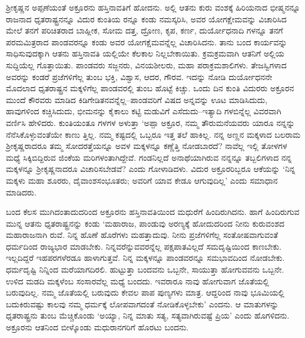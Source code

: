 ಶ್ರೀಕೃಷ್ಣನ ಅಪ್ಪಣೆಯಂತೆ ಅಕ್ರೂರನು ಹಸ್ತಿನಾವತಿಗೆ ಹೋದನು. ಅಲ್ಲಿ ಆತನು ಕುರು ವಂಶಕ್ಕೆ ಹಿರಿಯನಾದ ಭೀಷ್ಮನನ್ನೂ ರಾಜನಾದ ಧೃತರಾಷ್ಟ್ರನನ್ನೂ ವಿದುರ ಕುಂತಿಯ ರನ್ನೂ ಕಂಡು ನಮಸ್ಕರಿಸಿ, ಅವರ ಯೋಗಕ್ಷೇಮವನ್ನು ವಿಚಾರಿಸಿದ ಮೇಲೆ ತನಗೆ ಪರಿಚಿತರಾದ ಬಾಹ್ಲೀಕ, ಸೋಮ ದತ್ತ, ದ್ರೋಣ, ಕೃಪ, ಕರ್ಣ, ದುರ್ಯೋಧನಾದಿ ಗಳನ್ನೂ ತನಗೆ ಪರಮಮಿತ್ರರಾದ ಪಾಂಡವರನ್ನೂ ಕಂಡು ಅವರ ಯೋಗಕ್ಷೆಮವನ್ನೆಲ್ಲ ವಿಚಾರಿಸಿದನು. ತಾನು ಬಂದ ಕಾರ್ಯವನ್ನು ಸಾಧಿಸುವುದಕ್ಕಾಗಿ ಆತನು ಹಸ್ತಿನಾವತಿ ಯಲ್ಲಿಯೇ ಕೆಲಕಾಲ ನಿಲ್ಲಬೇಕಾಯಿತು. ಕ್ರಮಕ್ರಮವಾಗಿ ಆತನಿಗೆ ಅಲ್ಲಿಯ ಸುದ್ದಿಯೆಲ್ಲ ಗೊತ್ತಾಯಿತು. ಪಾಂಡವರು ಸಜ್ಜನರು, ವಿನಯಶೀಲರು, ಮಹಾ ಪರಾಕ್ರಮಶಾಲಿಗಳು. ತೇಜಸ್ವಿಗಳಾದ ಅವರನ್ನು ಕಂಡರೆ ಪ್ರಜೆಗಳಿಗೆಲ್ಲ ತುಂಬ ಭಕ್ತಿ, ವಿಶ್ವಾಸ, ಆದರ, ಗೌರವ. ಇದನ್ನು ನೋಡಿ ದುರ್ಯೋಧನನೇ ಮೊದಲಾದ ಧೃತರಾಷ್ಟ್ರನ ಮಕ್ಕಳಿಗೆಲ್ಲ ಪಾಂಡವರಲ್ಲಿ ತುಂಬ ಹೊಟ್ಟೆ ಕಿಚ್ಚು. ಒಂದು ದಿನ ಕುಂತಿ ವಿದುರರು ಅಕ್ರೂರನ ಮುಂದೆ ಕೌರವರು ಮಾಡಿದ ಕಿಡಿಗೇಡಿತನವನ್ನೆಲ್ಲ–ಪಾಂಡವರಿಗೆ ವಿಷದ ಅನ್ನವನ್ನು ಊಟ ಮಾಡಿಸಿದುದು, ಹಾವುಗಳಿಂದ ಕಚ್ಚಿಸಿದುದು, ಭೀಮನನ್ನು ಕೈಕಾಲು ಕಟ್ಟಿ ಮಡುವಿಗೆ ಎಸೆದುದು–ಇತ್ಯಾದಿ ಗಳಬಿನ್ನೆಲ್ಲ ವಿವರವಾಗಿ ವರ್ಣಿಸಿ ಹೇಳಿದರು. ಕುಂತಿಯಂತೂ ಗಳಗಳ ಅಳುತ್ತಾ ‘ಅಪ್ಪಾ ಅಕ್ರೂರ, ನಮ್ಮ ತೌರುಮನೆಯವರು ಯಾರೂ ನನ್ನನ್ನು ನೆನೆಸಿಕೊಳ್ಳುವಂತೆಯೇ ಕಾಣು ತ್ತಿಲ್ಲ. ನಮ್ಮ ಕಷ್ಟದಲ್ಲಿ ಒಬ್ಬರೂ ಇತ್ತ ತಲೆ ಹಾಕಿಲ್ಲ. ನನ್ನ ಅಣ್ಣನ ಮಕ್ಕಳಾದ ಬಲರಾಮ ಶ್ರೀಕೃಷ್ಣರಾದರೂ ತಮ್ಮ ಸೋದರತ್ತೆಯನ್ನೂ ಅವಳ ಮಕ್ಕಳನ್ನೂ ಕಣ್ಣೆತ್ತಿ ನೋಡಬಾರದೆ? ನಾವೆಲ್ಲ ಇಲ್ಲಿ ತೋಳಗಳ ಮಧ್ಯೆ ಸಿಕ್ಕಿಬಿದ್ದಿರುವ ಜಿಂಕೆಯ ಮರಿಗಳಂತಾಗಿದ್ದೇವೆ. ಗಂಡನಿಲ್ಲದೆ ಅನಾಥೆಯಾಗಿರುವ ನನ್ನನ್ನೂ ತಬ್ಬಲಿಗಳಾದ ನನ್ನ ಮಕ್ಕಳನ್ನೂ ಶ್ರೀಕೃಷ್ಣನಾದರೂ ವಿಚಾರಿಸಬೇಡವೆ? ಎಂದು ಗೋಳಾಡಿದಳು. ವಿದುರ ಅಕ್ರೂರರಿಬ್ಬರೂ ಆಕೆಯನ್ನು ‘ನಿನ್ನ ಮಕ್ಕಳು ಮಹಾ ಶೂರರು, ದೈವಾಂಶಸಂಭೂತರು; ಅವರಿಗೆ ಯಾವ ಕೇಡೂ ಆಗುವುದಿಲ್ಲ’ ಎಂದು ಸಮಾಧಾನ ಮಾಡಿದರು.

ಬಂದ ಕೆಲಸ ಮುಗಿದಂತಾದುದರಿಂದ ಅಕ್ರೂರನು ಹಸ್ತಿನಾವತಿಯಿಂದ ಮಧುರೆಗೆ ಹಿಂದಿರುಗಿದನು. ಹಾಗೆ ಹಿಂದಿರುಗುವ ಮುನ್ನ ಆತನು ಧೃತರಾಷ್ಟ್ರನನ್ನು ಕಂಡು ‘ಮಹಾರಾಜ, ಪಾಂಡುವು ಅರಣ್ಯಕ್ಕೆ ಹೋದುದರಿಂದ ನೀನು ಕುರುವಂಶದ ಮಹಾರಾಜನಾಗಿ ರುವೆ. ನಿನ್ನ ಹೊಣೆ ಹೊರೆಗಳು ಮಹತ್ತಾದುವು. ನೀನು ಪ್ರಜೆಗಳಿಗೆಲ್ಲ ಸಂತೋಷವಾಗುವಂತೆ ಧರ್ಮದಿಂದ ರಾಜ್ಯಭಾರ ಮಾಡಬೇಕು. ನಿನ್ನವರೆನ್ನುವವರನ್ನೆಲ್ಲ ಪಕ್ಷಪಾತವಿಲ್ಲದೆ ಸಮದೃಷ್ಟಿಯಿಂದ ಕಾಣಬೇಕು. ಇಲ್ಲದಿದ್ದರೆ ಇಹಪರಗಳೆರಡೂ ಹಾಳಾಗುತ್ತವೆ. ನಿನ್ನ ಮಕ್ಕಳನ್ನೂ ಪಾಂಡವರನ್ನೂ ಸಮಭಾವದಿಂದ ನೋಡಬೇಕು. ಧರ್ಮದೃಷ್ಟಿ ನಿನ್ನಿಂದ ಮರೆಯಾಗದಿರಲಿ. ಹುಟ್ಟುತ್ತಾ ಬಂದವನು ಒಬ್ಬನೇ, ಸಾಯುತ್ತಾ ಹೋಗುವವನು ಒಬ್ಬನೇ. ಉಳಿದ ಮಡದಿ ಮಕ್ಕಳೆಂಬ ಸಂಸಾರವೆಲ್ಲ ಮಧ್ಯೆ ಬಂದದು. ಇವರಾರೂ ನಾವು ಹೋಗುವಾಗ ಜೊತೆಯಲ್ಲಿ ಬರುವುದಿಲ್ಲ. ನಮ್ಮ ಜೊತೆಯಲ್ಲಿ ಬರುವುದು ಕೇವಲ ಪಾಪ ಪುಣ್ಯಗಳು ಮಾತ್ರ. ಆದ್ದರಿಂದ ನಾವು ಭೂಮಿಯಲ್ಲಿ ಬದುಕಿರುವಷ್ಟು ಕಾಲವು ನಮ್ಮ ಧರ್ಮಕ್ಕೆ ಲೋಪವಾಗದಂತೆ ನೋಡಿಕೊಳ್ಳಬೇಕು’ ಎಂದನು. ಆ ಮಾತುಗಳನ್ನು ಧೃತರಾಷ್ಟ್ರನು ತುಂಬ ಮೆಚ್ಚಿಕೊಂಡು ‘ಅಯ್ಯಾ, ನಿನ್ನ ಮಾತು ಸತ್ಯ, ಸತ್ಯವಾಗಿರುವಷ್ಟೆ ಪ್ರಿಯ’ ಎಂದು ಹೊಗಳಿದನು. ಅಕ್ರೂರನು ಆತನಿಂದ ಬೀಳ್ಕೊಂಡು ಮಧುರಾನಗರಿಗೆ ಹೊರಟು ಬಂದನು.

